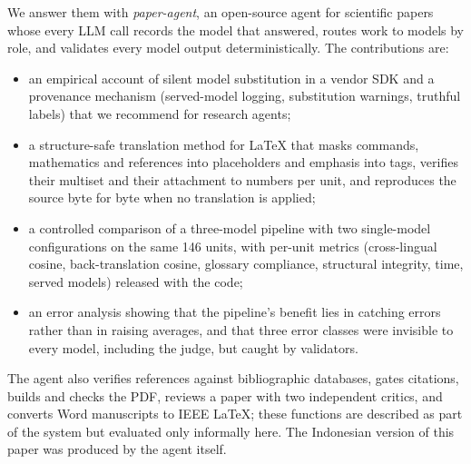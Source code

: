 We answer them with \emph{paper-agent}, an open-source agent for scientific papers whose every LLM call records the model that answered, routes work to models by role, and validates every model output deterministically. The contributions are:
\begin{itemize}
  \item an empirical account of silent model substitution in a vendor SDK and a provenance mechanism (served-model logging, substitution warnings, truthful labels) that we recommend for research agents;
  \item a structure-safe translation method for LaTeX that masks commands, mathematics and references into placeholders and emphasis into tags, verifies their multiset and their attachment to numbers per unit, and reproduces the source byte for byte when no translation is applied;
  \item a controlled comparison of a three-model pipeline with two single-model configurations on the same 146 units, with per-unit metrics (cross-lingual cosine, back-translation cosine, glossary compliance, structural integrity, time, served models) released with the code;
  \item an error analysis showing that the pipeline's benefit lies in catching errors rather than in raising averages, and that three error classes were invisible to every model, including the judge, but caught by validators.
\end{itemize}
The agent also verifies references against bibliographic databases, gates citations, builds and checks the PDF, reviews a paper with two independent critics, and converts Word manuscripts to IEEE LaTeX; these functions are described as part of the system but evaluated only informally here. The Indonesian version of this paper was produced by the agent itself.
